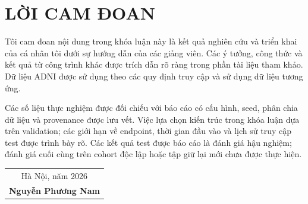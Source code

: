 \chapter*{LỜI CAM ĐOAN}

Tôi cam đoan nội dung trong khóa luận này là kết quả nghiên cứu và triển khai của cá nhân tôi dưới sự hướng dẫn của các giảng viên. Các ý tưởng, công thức và kết quả từ công trình khác được trích dẫn rõ ràng trong phần tài liệu tham khảo. Dữ liệu ADNI được sử dụng theo các quy định truy cập và sử dụng dữ liệu tương ứng.

Các số liệu thực nghiệm được đối chiếu với báo cáo có cấu hình, seed, phân chia dữ liệu và provenance được lưu vết. Việc lựa chọn kiến trúc trong khóa luận dựa trên validation; các giới hạn về endpoint, thời gian đầu vào và lịch sử truy cập test được trình bày rõ. Các kết quả test được báo cáo là đánh giá hậu nghiệm; đánh giá cuối cùng trên cohort độc lập hoặc tập giữ lại mới chưa được thực hiện.

\vspace{1.5cm}
\begin{flushright}
\begin{tabular}{@{}c@{}}
Hà Nội, năm 2026\\[1.5cm]
\textbf{Nguyễn Phương Nam}
\end{tabular}
\end{flushright}
